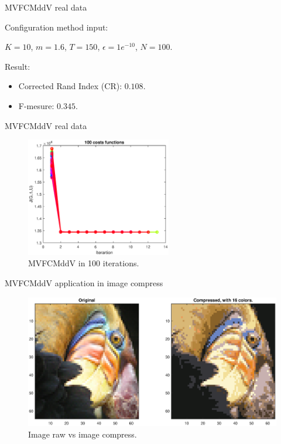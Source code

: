 \documentclass{beamer}
\begin{document}
\begin{frame}{MVFCMddV real data}

Configuration method input:
 
$K =10$, $m = 1.6$, $T = 150$, $\epsilon = 1e^{-10}$, $N = 100$.

Result: 
\begin{itemize}
\item Corrected Rand Index (CR): $0.108$.
\item F-mesure: $0.345$. 
\end{itemize}

\end{frame}

\begin{frame}{MVFCMddV real data}

\begin{figure}[h]
\centering
\includegraphics[width=2.5in]{../out/cost-function-mvfcmddv.eps}
\caption{MVFCMddV in 100 iterations.}
\label{fig:data_base}
\end{figure}
\end{frame}


\begin{frame}{MVFCMddV application in image compress}
\begin{figure}[h]
\centering
\includegraphics[width=4.5in]{../out/image-compress-16.eps}
\caption{Image raw vs image compress.}
\label{fig:image_compress}
\end{figure}
\end{frame}
\end{document}
